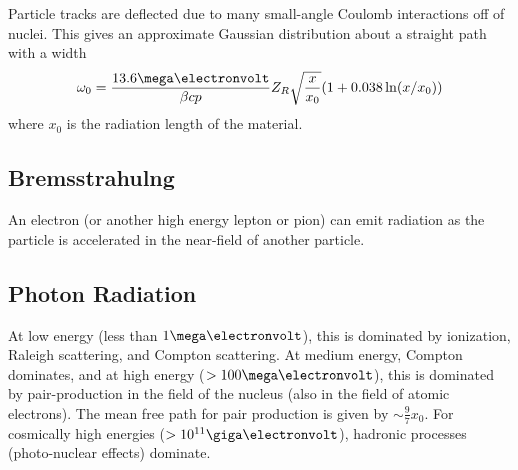 \documentclass[a4paper,twoside,master.tex]{subfiles}
\begin{document}
Particle tracks are deflected due to many small-angle Coulomb interactions off of nuclei. This gives an approximate Gaussian distribution about a straight path with a width
\begin{equation}
    \omega_0 = \frac{13.6\mega\electronvolt}{\beta c p} Z_R \sqrt{\frac{x}{x_0}} (1 + 0.038 \ln(x/x_0))
\end{equation}
where $ x_0 $ is the radiation length of the material.

\subsection{Bremsstrahulng}
\label{sub:bremsstrahulng}

An electron (or another high energy lepton or pion) can emit radiation as the particle is accelerated in the near-field of another particle.

\subsection{Photon Radiation}
\label{sub:photon_radiation}

At low energy (less than $ 1 \mega\electronvolt $), this is dominated by ionization, Raleigh scattering, and Compton scattering. At medium energy, Compton dominates, and at high energy ($ > 100 \mega\electronvolt $), this is dominated by pair-production in the field of the nucleus (also in the field of atomic electrons). The mean free path for pair production is given by $ \sim \frac{9}{7} x_0 $. For cosmically high energies ($ > 10^{11} \giga\electronvolt $), hadronic processes (photo-nuclear effects) dominate.
\end{document}
